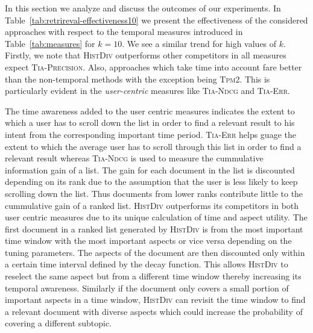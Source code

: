 In this section we analyze and discuss the outcomes of our experiments. In Table~\ref{tab:retrireval-effectiveness10} we present the effectiveness of the considered approaches with respect to the temporal measures introduced in Table~\ref{tab:measures} for $k=10$. We see a similar trend for high values of $k$. Firstly, we note that \textsc{HistDiv} outperforms other competitors in all measures expect \textsc{Tia-Precision}. Also, approaches which take time into account fare better than the non-temporal methods with the exception being \textsc{Tpm2}. This is particularly evident in the \emph{user-centric} measures like \textsc{Tia-Ndcg} and \textsc{Tia-Err}.

The time awareness added to the user centric measures indicates the extent to which a user has to scroll down the list in order to find a relevant result to his intent from the corresponding important time period. \textsc{Tia-Err} helps guage the extent to which the average user has to scroll through this list in order to find a relevant result whereas \textsc{Tia-Ndcg} is used to measure the cummulative information gain of a list. The gain for each document in the list is discounted depending on its rank due to the assumption that the user is less likely to keep scrolling down the list. Thus documents from lower ranks contribute little to the cummulative gain of a ranked list.  \textsc{HistDiv} outperforms its competitors in both user centric measures due to its unique calculation of time and aspect utility. The first document in a ranked list generated by \textsc{HistDiv} is from the most important time window with the most important aspects or vice versa depending on the tuning parameters. The aspects of the document are then discounted only within a certain time interval defined by the decay function. This allows \textsc{HistDiv} to reselect the same aspect but from a different time window thereby increasing its temporal awareness. Similarly if the document only covers a small portion of important aspects in a time window, \textsc{HistDiv} can revisit the time window to find a relevant document with diverse aspects which could increase the probability of covering a different subtopic.


